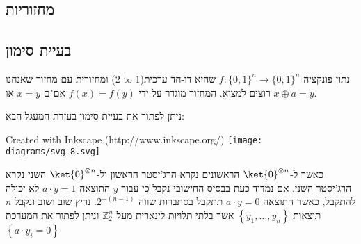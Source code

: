 \documentclass{tstextbook}
\begin{document}
\subsection{מחזוריות}

\subsection{בעיית סימון}

\begin{definition}
נתון פונקציה \(f:\{ 0,1 \}^{n}\to \{ 0,1 \}^{n}\) שהיא דו-חד ערכית(\(\text{2 to 1}\)) ומחזורית עם מחזור שאנחנו רוצים למצוא. המחזור מוגדר על ידי \(f(x)=f(y)\) אם"ם \(x=y\) או \(x\oplus a =y\).

\end{definition}
\begin{proposition}
ניתן לפתור את בעיית סימון בעזרת המעגל הבא:

 Created with Inkscape (http://www.inkscape.org/) \texttt{[image: diagrams/svg\_8.svg]}
\end{proposition}
כאשר ל-\(\ket{0}^{\otimes n}\) הראשונים נקרא הרג'יסטר הראשון ול-\(\ket{0}^{\otimes n}\) השני נקרא הרג'יסטר השני. אם נמדוד כעת בבסיס החישובי נקבל כי עבור \(y\) התוצאה \(a\cdot y = 1\) לא יכולה להתקבל, כאשר התוצאה \(a\cdot y = 0\) תתקבל בסתברות שווה \(2^{-(n-1)}\). נריץ שוב ושוב ונקבל \(n\) תוצאות \(\left\{  y_{1},\dots,y_{n}  \right\}\)  אשר בלתי תלויות לינארית מעל \(\mathbb{Z}_{2}^{n}\) וניתן לפתור את המערכת \(\left\{  a\cdot y_{i}=0  \right\}\)
\end{document}

